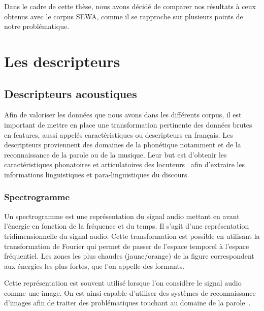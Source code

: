 Dans le cadre de cette thèse, nous avons décidé de comparer nos résultats à ceux obtenus avec le corpus SEWA, comme il se rapproche sur plusieurs points de notre problématique.

\section{Les descripteurs}
\subsection{Descripteurs acoustiques}
Afin de valoriser les données que nous avons dans les différents corpus, il est important de mettre en place une transformation pertinente des données brutes en features, aussi appelés caractéristiques ou descripteurs en français. Les descripteurs proviennent des domaines de la phonétique notamment et de la reconnaissance de la parole ou de la musique. Leur but est d'obtenir les caractéristiques phonatoires et articulatoires des locuteurs~\cite{Scherer1986} afin d'extraire les informations linguistiques et para-linguistiques du discours.

\subsubsection{Spectrogramme}
%

Un spectrogramme est une représentation du signal audio mettant en avant l'énergie en fonction de la fréquence et du temps. %
Il s'agit d'une représentation tridimensionnelle du signal audio. Cette transformation est possible en utilisant la transformation de Fourier qui permet de passer de l'espace temporel à l'espace fréquentiel. Les zones les plus chaudes (jaune/orange) de la figure correspondent aux énergies les plus fortes, que l'on appelle des formants.

Cette représentation est souvent utilisé lorsque l'on considère le signal audio comme une image. On est ainsi capable d'utiliser des systèmes de reconnaissance d'images afin de traiter des problématiques touchant au domaine de la parole~\cite{Stolar2017}.



